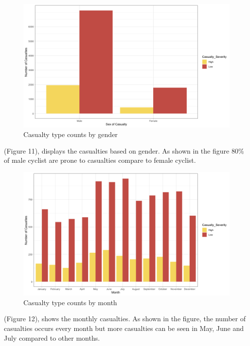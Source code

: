 \documentclass[
  a4paper,
]{article}
\begin{document}
\newpage
\begin{figure}[h!]

{\centering \includegraphics[width=0.75\linewidth]{sc} 

}

\caption{Casualty type counts by gender}\label{fig:unnamed-chunk-12}
\end{figure}

(Figure 11), displays the casualties based on gender. As shown in the
figure 80\% of male cyclist are prone to casualties compare to female
cyclist.

\begin{figure}[h!]

{\centering \includegraphics[width=0.75\linewidth]{date} 

}

\caption{Casualty type counts by month}\label{fig:unnamed-chunk-13}
\end{figure}

(Figure 12), shows the monthly casualties. As shown in the figure, the
number of casualties occurs every month but more casualties can be seen
in May, June and July compared to other months.
\end{document}
